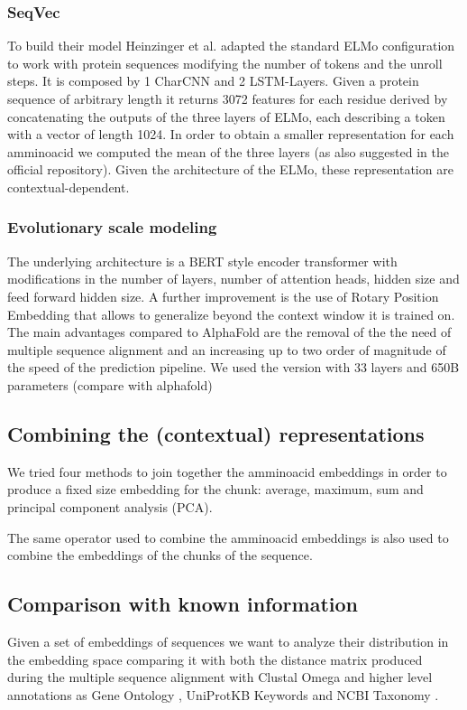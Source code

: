 \documentclass[12pt, letterpaper, twocolumn]{article}
\begin{document}
\subsubsection{SeqVec \cite{heinzinger2019modeling} }
To build their model Heinzinger et al.\cite{heinzinger2019modeling} adapted the standard ELMo configuration \cite{peters-etal-2018-deep} to work with protein sequences modifying the number of tokens and the unroll steps. It is composed by 1 CharCNN and 2 LSTM-Layers. Given a protein sequence of arbitrary length it returns 3072 features for each residue derived by concatenating the outputs of the three layers of ELMo, each describing a token with a vector of length 1024. In order to obtain a smaller representation for each amminoacid we computed the mean of the three layers (as also suggested in the official repository). Given the architecture of the ELMo, these representation are contextual-dependent.


\subsubsection{Evolutionary scale modeling \cite{lin2023evolutionary}}
The underlying architecture is a BERT \cite{devlin2018bert} style encoder transformer with modifications in the number of layers, number of attention heads, hidden size and feed forward hidden size. A further improvement is the use of Rotary Position Embedding \cite{su2021roformer} that allows to generalize beyond the context window it is trained on.
The main advantages compared to AlphaFold are the removal of the the need of multiple sequence alignment and an increasing up to two order of magnitude of  the speed of the prediction pipeline.
We used the version with 33 layers and 650B parameters (compare with alphafold) 


\subsection{Combining the (contextual) representations}
We tried four methods to join together the amminoacid embeddings in order to produce a fixed size embedding for the chunk: average, maximum, sum and principal component analysis (PCA). 

The same operator used to combine the amminoacid embeddings is also used to combine the embeddings of the chunks of the sequence.

\subsection{Comparison with known information}
Given a set of embeddings of sequences we want to analyze their distribution in the embedding space comparing it with both the distance matrix produced during the multiple sequence alignment with Clustal Omega \cite{sievers2011fast} and higher level annotations as Gene Ontology \cite{10.1093/genetics/iyad031, ashburner2000gene}, UniProtKB Keywords and NCBI Taxonomy \cite{uniprot23}.
\end{document}
